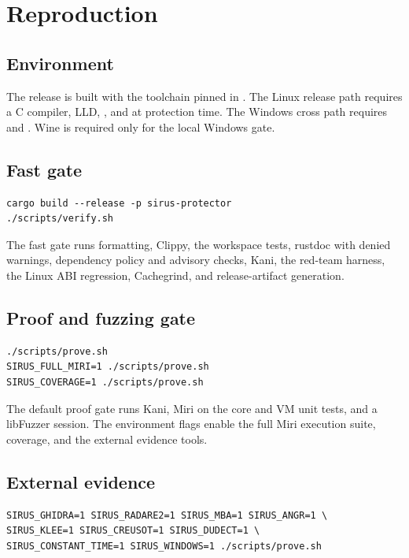 \section{Reproduction}
\label{app:reproduction}

\subsection{Environment}

The release is built with the toolchain pinned in .
The Linux release path requires a C compiler, LLD, , and
 at protection time. The Windows cross path requires
 and . Wine is required only for the
local Windows gate.

\subsection{Fast gate}

\begin{verbatim}
cargo build --release -p sirus-protector
./scripts/verify.sh
\end{verbatim}

The fast gate runs formatting, Clippy, the workspace tests, rustdoc with denied
warnings, dependency policy and advisory checks, Kani, the red-team harness, the
Linux ABI regression, Cachegrind, and release-artifact generation.

\subsection{Proof and fuzzing gate}

\begin{verbatim}
./scripts/prove.sh
SIRUS_FULL_MIRI=1 ./scripts/prove.sh
SIRUS_COVERAGE=1 ./scripts/prove.sh
\end{verbatim}

The default proof gate runs Kani, Miri on the core and VM unit tests, and a
libFuzzer session. The environment flags enable the full Miri execution suite,
coverage, and the external evidence tools.

\subsection{External evidence}

\begin{verbatim}
SIRUS_GHIDRA=1 SIRUS_RADARE2=1 SIRUS_MBA=1 SIRUS_ANGR=1 \
SIRUS_KLEE=1 SIRUS_CREUSOT=1 SIRUS_DUDECT=1 \
SIRUS_CONSTANT_TIME=1 SIRUS_WINDOWS=1 ./scripts/prove.sh
\end{verbatim}

